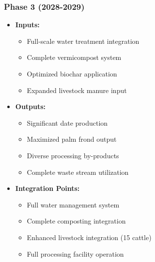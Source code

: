 \subsubsection{Phase 3 (2028-2029)}
\begin{itemize}
    \item \textbf{Inputs:}
    \begin{itemize}
        \item Full-scale water treatment integration
        \item Complete vermicompost system
        \item Optimized biochar application
        \item Expanded livestock manure input
    \end{itemize}
    \item \textbf{Outputs:}
    \begin{itemize}
        \item Significant date production
        \item Maximized palm frond output
        \item Diverse processing by-products
        \item Complete waste stream utilization
    \end{itemize}
    \item \textbf{Integration Points:}
    \begin{itemize}
        \item Full water management system
        \item Complete composting integration
        \item Enhanced livestock integration (15 cattle)
        \item Full processing facility operation
    \end{itemize}
\end{itemize}

